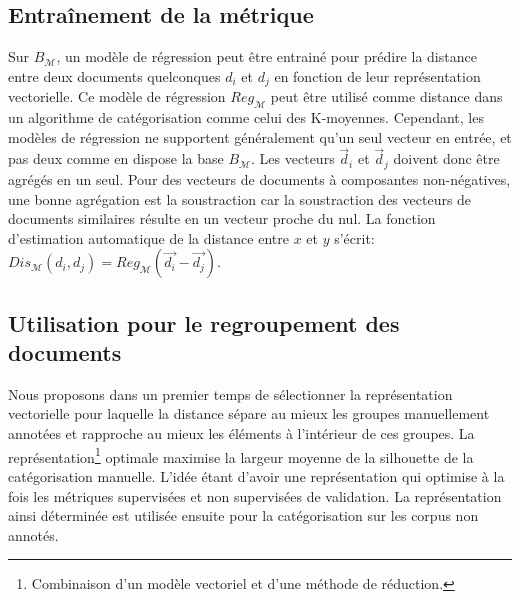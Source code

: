 \subsection{Entraînement de la métrique}

Sur $B_\mathcal{M}$, un modèle de régression peut être entrainé pour prédire la distance entre deux documents quelconques $d_i$ et $d_j$ en fonction de leur représentation vectorielle. Ce modèle de régression $Reg_\mathcal{M}$ peut être utilisé comme distance dans un algorithme de catégorisation comme celui des K-moyennes. Cependant, les modèles de régression ne supportent généralement qu'un seul vecteur en entrée, et pas deux comme en dispose la base $B_\mathcal{M}$. Les vecteurs $\vec{d}_i$ et $\vec{d}_j$ doivent donc être agrégés en un seul. Pour des vecteurs de documents à composantes non-négatives, une bonne agrégation est la soustraction car la soustraction des vecteurs de documents similaires résulte en un vecteur proche du nul. La fonction d'estimation automatique de la distance entre $x$ et $y$ s'écrit: $Dis_\mathcal{M}(d_i, d_j) = Reg_\mathcal{M}(\vec{d_{i}} - \vec{d_{j}})$. 

\subsection{Utilisation pour le regroupement des documents}
 Nous proposons dans un premier temps de sélectionner la représentation vectorielle pour laquelle la distance sépare au mieux les groupes manuellement annotées et rapproche au mieux les éléments à l'intérieur de ces groupes. La représentation\footnote{Combinaison d'un modèle vectoriel et d'une méthode de réduction.} optimale maximise la largeur moyenne de la silhouette de la catégorisation manuelle. L'idée étant d'avoir une représentation qui optimise à la fois les métriques supervisées et non supervisées de validation. La représentation ainsi déterminée est utilisée ensuite pour la catégorisation sur les corpus non annotés. %

